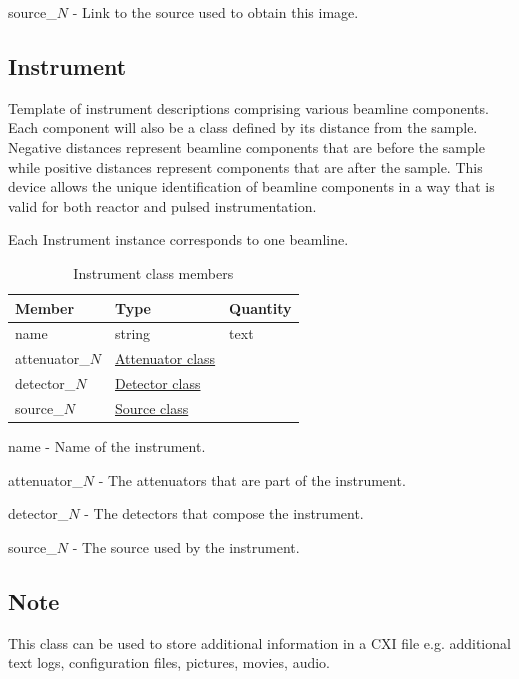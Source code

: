\documentclass[usletter,11pt]{article}
\newcommand{\member}[2]
{ \noindent
{ \color{softBlue}  #1 - } #2
\vspace{0.2cm}
}
\begin{document}
\member{source\_$N$}{Link to the source used to obtain this image.}

\subsection{Instrument}
\label{table:instrument}

Template of instrument descriptions comprising various beamline
components. Each component will also be a class defined by its
distance from the sample. Negative distances represent beamline
components that are before the sample while positive distances
represent components that are after the sample. This device allows the
unique identification of beamline components in a way that is valid
for both reactor and pulsed instrumentation.

 Each Instrument instance
corresponds to one beamline.

\begin{table}[h!]\sffamily \footnotesize
\caption{Instrument class members}

\begin{tabular}{p{4.5cm} p{4.5cm}  p{2.5cm} }

\toprule
\bfseries Member     & \bfseries Type & \bfseries Quantity \\
\midrule

name & string & text \\
attenuator\_$N$ &  \hyperref[table:attenuator]{Attenuator class} & \\
detector\_$N$ &  \hyperref[table:detector]{Detector class} & \\
source\_$N$ &  \hyperref[table:source]{Source class} & \\
\bottomrule
\end{tabular}
\end{table}

\member{name}{Name of the instrument.}

\member{attenuator\_$N$}{The attenuators that are part of the
 instrument.}

\member{detector\_$N$}{The detectors that compose the instrument.}

\member{source\_$N$}{The source used by the instrument.}

\subsection{Note}
\label{table:note}

This class can be used to store additional information in a CXI file
e.g. additional text logs, configuration files, pictures, movies, audio.
\end{document}
